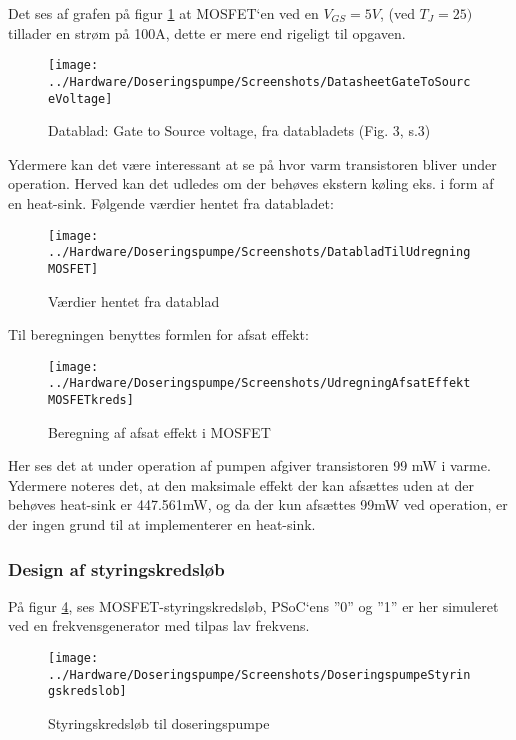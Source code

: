 Det ses af grafen på figur \ref{screenshot:GateToSourceVoltage} at MOSFET`en ved en $ V_{GS} = 5V $, (ved $T_J = 25)$ tillader en strøm på 100A, dette er mere end rigeligt til opgaven.

\begin{figure}[!h]
	\centering
	\texttt{[image: ../Hardware/Doseringspumpe/Screenshots/DatasheetGateToSourceVoltage]}
	\caption{Datablad: Gate to Source voltage, fra databladets (Fig. 3, s.3)}
	\label{screenshot:GateToSourceVoltage}
\end{figure}

Ydermere kan det være interessant at se på hvor varm transistoren bliver under operation. Herved kan det udledes om der behøves ekstern køling eks. i form af en heat-sink.
Følgende værdier hentet fra databladet: 

\begin{figure}[!h]
	\centering
	\texttt{[image: ../Hardware/Doseringspumpe/Screenshots/DatabladTilUdregningMOSFET]}
	\caption{Værdier hentet fra datablad}
	\label{screenshot:Values}
\end{figure}

\newpage
Til beregningen benyttes formlen for afsat effekt: 

\begin{figure}[!h]
	\centering
	\texttt{[image: ../Hardware/Doseringspumpe/Screenshots/UdregningAfsatEffektMOSFETkreds]}
	\caption{Beregning af afsat effekt i MOSFET}
	\label{screenshot:afsatEffektMOSFET}
\end{figure}

Her ses det at under operation af pumpen afgiver transistoren 99 mW i varme. Ydermere noteres det, at den maksimale effekt der kan afsættes uden at der behøves heat-sink er 447.561mW, og da der kun afsættes 99mW ved operation, er der ingen grund til at implementerer en heat-sink.

\subsubsection{Design af styringskredsløb}
På figur \ref{screenshot:Styringskreds}, ses MOSFET-styringskredsløb, PSoC`ens ”0” og ”1” er her simuleret ved en frekvensgenerator med tilpas lav frekvens.

\begin{figure}[!h]
	\centering
	\texttt{[image: ../Hardware/Doseringspumpe/Screenshots/DoseringspumpeStyringskredslob]}
	\caption{Styringskredsløb til doseringspumpe}
	\label{screenshot:Styringskreds}
\end{figure}

